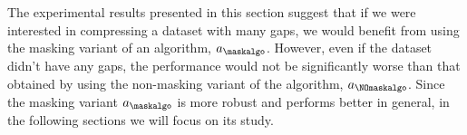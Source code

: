 The experimental results presented in this section suggest that if we were interested in compressing a dataset with many gaps, we would benefit from using the masking variant of an algorithm, $a_\maskalgo$. However, even if the dataset didn't have any gaps, the performance would not be significantly worse than that obtained by using the non-masking variant of the algorithm, $a_\NOmaskalgo$. Since the masking variant $a_\maskalgo$ is more robust and performs better in general, in the following sections we will focus on its study.
